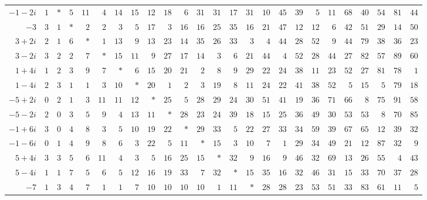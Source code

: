 \begin{longtable}{@{}r|r|r|r|r|r|r|r|r|r|r|r|r|r|r|r|r|r|r|r|r|r|r|r|r@{}}
$-1-2i$ & $1$ & $\ast$ & $5$ & $11$ & $4$ & $14$ & $15$ & $12$ & $18$ & $6$ & $31$ & $31$ & $17$ & $31$ & $10$ & $45$ & $39$ & $5$ & $11$ & $68$ & $40$ & $54$ & $81$ & $44$\\
$-3$ & $3$ & $1$ & $\ast$ & $2$ & $2$ & $3$ & $5$ & $17$ & $3$ & $16$ & $16$ & $25$ & $35$ & $16$ & $21$ & $47$ & $12$ & $12$ & $6$ & $42$ & $51$ & $29$ & $14$ & $50$\\
$3+2i$ & $2$ & $1$ & $6$ & $\ast$ & $1$ & $13$ & $9$ & $13$ & $23$ & $14$ & $35$ & $26$ & $33$ & $3$ & $4$ & $44$ & $28$ & $52$ & $9$ & $44$ & $79$ & $38$ & $36$ & $23$\\
$3-2i$ & $3$ & $2$ & $2$ & $7$ & $\ast$ & $15$ & $11$ & $9$ & $27$ & $17$ & $14$ & $3$ & $6$ & $21$ & $44$ & $4$ & $52$ & $28$ & $44$ & $27$ & $82$ & $57$ & $89$ & $60$\\
$1+4i$ & $1$ & $2$ & $3$ & $9$ & $7$ & $\ast$ & $6$ & $15$ & $20$ & $21$ & $2$ & $8$ & $9$ & $29$ & $22$ & $24$ & $38$ & $11$ & $23$ & $52$ & $27$ & $81$ & $78$ & $1$\\
$1-4i$ & $2$ & $3$ & $1$ & $1$ & $3$ & $10$ & $\ast$ & $20$ & $1$ & $2$ & $3$ & $19$ & $8$ & $11$ & $24$ & $22$ & $41$ & $38$ & $52$ & $5$ & $15$ & $5$ & $79$ & $18$\\
$-5+2i$ & $0$ & $2$ & $1$ & $3$ & $11$ & $11$ & $12$ & $\ast$ & $25$ & $5$ & $28$ & $29$ & $24$ & $30$ & $51$ & $41$ & $19$ & $36$ & $71$ & $66$ & $8$ & $75$ & $91$ & $58$\\
$-5-2i$ & $2$ & $0$ & $3$ & $5$ & $9$ & $4$ & $13$ & $11$ & $\ast$ & $28$ & $23$ & $24$ & $39$ & $18$ & $15$ & $25$ & $36$ & $49$ & $30$ & $53$ & $53$ & $8$ & $70$ & $85$\\
$-1+6i$ & $3$ & $0$ & $4$ & $8$ & $3$ & $5$ & $10$ & $19$ & $22$ & $\ast$ & $29$ & $33$ & $5$ & $22$ & $27$ & $33$ & $34$ & $59$ & $39$ & $67$ & $65$ & $12$ & $39$ & $32$\\
$-1-6i$ & $0$ & $1$ & $4$ & $9$ & $8$ & $6$ & $3$ & $22$ & $5$ & $11$ & $\ast$ & $15$ & $3$ & $10$ & $7$ & $1$ & $29$ & $34$ & $49$ & $21$ & $12$ & $87$ & $32$ & $9$\\
$5+4i$ & $3$ & $3$ & $5$ & $6$ & $11$ & $4$ & $3$ & $5$ & $16$ & $25$ & $15$ & $\ast$ & $32$ & $9$ & $16$ & $9$ & $46$ & $32$ & $69$ & $13$ & $26$ & $55$ & $4$ & $43$\\
$5-4i$ & $1$ & $1$ & $7$ & $5$ & $6$ & $5$ & $12$ & $16$ & $19$ & $33$ & $7$ & $32$ & $\ast$ & $15$ & $35$ & $16$ & $32$ & $46$ & $31$ & $15$ & $33$ & $70$ & $37$ & $28$\\
$-7$ & $1$ & $3$ & $4$ & $7$ & $1$ & $1$ & $7$ & $10$ & $10$ & $10$ & $10$ & $1$ & $11$ & $\ast$ & $28$ & $28$ & $23$ & $53$ & $51$ & $33$ & $83$ & $61$ & $11$ & $5$\\

\end{longtable}
